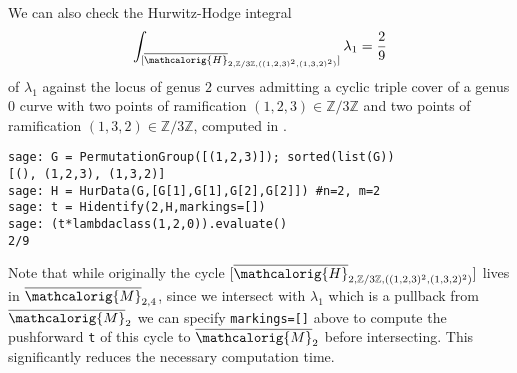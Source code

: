\documentclass[11pt]{article}
\begin{document}
We can also check the Hurwitz-Hodge integral
\[\int_{[\overline{\mathcalorig{H}}_{2,\mathbb{Z}/3\mathbb{Z},((1,2,3)^2,(1,3,2)^2)}]} \lambda_1  = \frac{2}{9} \]
of $\lambda_1$ against the locus of genus $2$ curves admitting a cyclic triple cover of a genus $0$ curve with two points of ramification $(1,2,3) \in \mathbb{Z}/3\mathbb{Z}$ and two points of ramification $(1,3,2) \in \mathbb{Z}/3\mathbb{Z}$,
computed in \cite[Section 5]{somerstep}.
\begin{lstlisting}
sage: G = PermutationGroup([(1,2,3)]); sorted(list(G))
[(), (1,2,3), (1,3,2)]
sage: H = HurData(G,[G[1],G[1],G[2],G[2]]) #n=2, m=2
sage: t = Hidentify(2,H,markings=[])
sage: (t*lambdaclass(1,2,0)).evaluate()
2/9
\end{lstlisting}
Note that while originally the cycle $[\overline{\mathcalorig{H}}_{2,\mathbb{Z}/3\mathbb{Z},((1,2,3)^2,(1,3,2)^2)}]$ lives in $\overline{\mathcalorig{M}}_{2,4}$, since we intersect with $\lambda_1$ which is a pullback from $\overline{\mathcalorig{M}}_2$ we can specify \texttt{markings=[]} above to compute the pushforward \texttt{t} of this cycle to $\overline{\mathcalorig{M}}_2$ before intersecting. This significantly reduces the necessary computation time.

\end{document}
